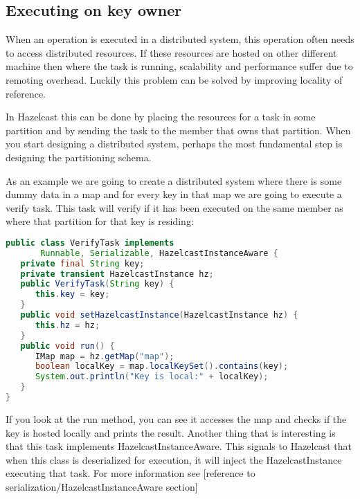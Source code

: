\subsection{Executing on key owner}
When an operation is executed in a distributed system, this operation often needs to access distributed resources. If these resources are hosted on other different machine then where the task is running, scalability and performance suffer due to remoting overhead. Luckily this problem can be solved by improving locality of reference.

In Hazelcast this can be done by placing the resources for a task in some partition and by sending the task to the member that owns that partition. When you start designing a distributed system, perhaps the most fundamental step is designing the partitioning schema.

As an example we are going to create a distributed system where there is some dummy data in a map and for every key in that map we are going to execute a verify task. This task will verify if it has been executed on the same member as where that partition for that key is residing:
\begin{lstlisting}[language=java]
public class VerifyTask implements
       Runnable, Serializable, HazelcastInstanceAware {
   private final String key;
   private transient HazelcastInstance hz;
   public VerifyTask(String key) { 
      this.key = key;
   }
   public void setHazelcastInstance(HazelcastInstance hz) {
      this.hz = hz;
   }
   public void run() {
      IMap map = hz.getMap("map");
      boolean localKey = map.localKeySet().contains(key);
      System.out.println("Key is local:" + localKey);
   }
}
\end{lstlisting}
If you look at the run method, you can see it accesses the map and checks if the key is hosted locally and prints the result. Another thing that is interesting is that this task implements HazelcastInstanceAware. This signals to Hazelcast that when this class is deserialized for execution, it will inject the HazelcastInstance executing that task. For more information see [reference to serialization/HazelcastInstanceAware section]

